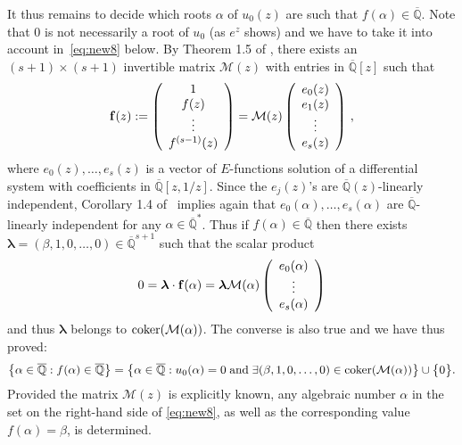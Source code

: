 \documentclass[reqno,english,12pt,a4paper]{smfart}
\numberwithin{equation}{section}
\def\Qbar{\overline{\mathbb Q}}
\def\f{{\bf f}}
\newcommand{\lambd}{{\boldsymbol{\lambda}}}
\begin{document}
It thus remains to decide which roots $\alpha$ of $u_0(z)$ are such that $f(\alpha)\in \Qbar$. Note that 0 is not necessarily a root of $u_0$ (as $e^z$ shows) and we have to take  it into account in~\eqref{eq:new8} below.
By Theorem 1.5 of \cite{beukers}, there exists an $(s+1)\times (s+1)$ invertible matrix $\mathcal{M}(z)$ with entries in 
$\overline{\mathbb Q}[z]$ such that  
\begin{equation}\label{eq: systeme}
\f(z):=\left( \begin{array}{ c }
     1 \\
     f(z)\\
     \vdots \\
     f^{(s-1)}(z)
  \end{array} \right) = \mathcal{M}(z)\left( \begin{array}{ c }
     e_0(z) \\
     e_1(z) \\
     \vdots \\
     e_s(z)
  \end{array} \right)  \, ,
\end{equation}
where $e_0(z),\ldots,e_s(z)$ is a vector of $E$-functions solution of a differential system with coefficients in 
$\overline{\mathbb Q}[z,1/z]$. Since the $e_j(z)$'s are $\Qbar(z)$-linearly independent,  Corollary 1.4 of~\cite{beukers} implies again that $e_0(\alpha),\ldots,e_s(\alpha)$ are 
$\Qbar$-linearly independent for any $\alpha \in \Qbar^*$. 
Thus if $f(\alpha) \in \overline{\mathbb Q}$ then there exists $\lambd=(\beta,1,0,\ldots,0)
\in \overline{\mathbb Q}^{s+1}$ such that the scalar product 
$$
0=\lambd \cdot  \f(\alpha) = \lambd \mathcal{M}(\alpha) \left( \begin{array}{ c }
     e_0(\alpha) \\
     \vdots \\
     e_s(\alpha)
  \end{array} \right)  
$$
and thus $\lambd$ belongs to ${\rm coker} (\mathcal{M}(\alpha))$. The converse is also true and we have thus proved: 
\begin{equation}\label{eq:new8}
\big\{\alpha \in \overline{\mathbb Q} : f(\alpha)\in \overline{\mathbb Q} \big\} = \big\{\alpha\in  \overline{\mathbb Q} :  u_0(\alpha)=0 \; \textup{and} \; \exists(\beta,1,0,\ldots,0) \in  {\rm coker} (\mathcal{M}(\alpha)) \big\}\cup \big\{0\big\}.
\end{equation}
Provided the matrix $\mathcal{M}(z)$ is explicitly known, any algebraic number $\alpha$ in the set on the right-hand side of \eqref{eq:new8}, as well as the corresponding value $f(\alpha)=\beta$, is determined.
\end{document}
